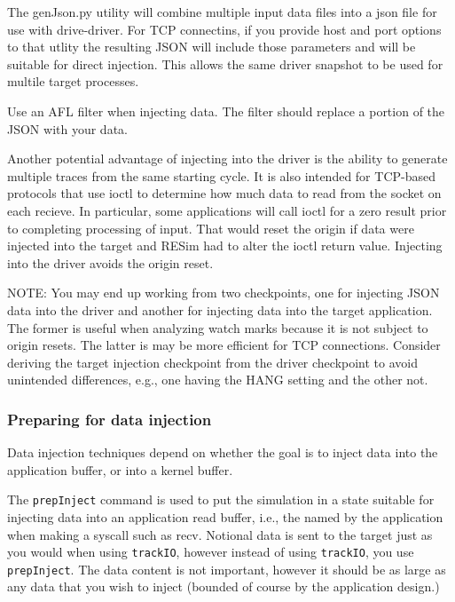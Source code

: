 \documentclass[titlepage]{article}
\begin{document}
The genJson.py utility will combine multiple input data files into a json file for use with drive-driver.  For TCP connectins, if 
you provide host and port options to that utlity the resulting JSON will include those parameters and will be suitable for direct injection.
This allows the same driver snapshot to be used for multile target processes.

Use an AFL filter when injecting data.  The filter should replace a portion of the JSON with your data.

Another potential advantage of injecting into the driver is the ability to generate multiple traces from the same starting cycle.  
It is also intended for TCP-based protocols that use ioctl to determine how much data to
read from the socket on each recieve.  In particular, some applications will call ioctl for a zero result prior to completing processing of input.  
That would reset the origin if data were injected into the target and RESim had to alter the ioctl return value.  Injecting into the driver avoids the
origin reset.  

NOTE:  You may end up working from two checkpoints, one for injecting JSON data into the driver and another for injecting data into the target application.
The former is useful when analyzing watch marks because it is not subject to origin resets.  The latter is may be more efficient for TCP connections.
Consider deriving the target injection checkpoint from the driver checkpoint to avoid unintended differences, e.g., one having the HANG setting and the other not.

\subsubsection{Preparing for data injection}
\label{prepInject}
Data injection techniques depend on whether the goal is to inject data into the application buffer, or into a kernel buffer.

The {\tt prepInject} command is used to put the simulation in a state suitable for injecting data into an application
read buffer, i.e., the named by the application when making a syscall such as recv.  Notional data is sent to the target just as you would when using
{\tt trackIO}, however instead of using {\tt trackIO}, you use {\tt prepInject}.  The data content is not important, however it should be as large as
any data that you wish to inject (bounded of course by the application design.)
\end{document}
